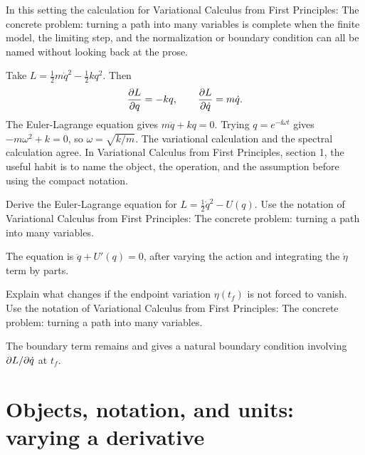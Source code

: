In this setting the calculation for Variational Calculus from First Principles: The concrete problem: turning a path into many variables is complete when the finite model, the limiting step, and the normalization or boundary condition can all be named without looking back at the prose.




\begin{example}
Take \(L=\frac12m\dot q^2-\frac12kq^2\).  Then
\[
  \frac{\partial L}{\partial q}=-kq,\qquad \frac{\partial L}{\partial\dot q}=m\dot q.
\]
The Euler-Lagrange equation gives \(m\ddot q+kq=0\).  Trying \(q=e^{-\ii\omega t}\) gives \(-m\omega^2+k=0\), so \(\omega=\sqrt{k/m}\).  The variational calculation and the spectral calculation agree.  In Variational Calculus from First Principles, section 1, the useful habit is to name the object, the operation, and the assumption before using the compact notation.
\end{example}



\begin{exercise}
Derive the Euler-Lagrange equation for \(L=\frac12\dot q^2-U(q)\).  Use the notation of Variational Calculus from First Principles: The concrete problem: turning a path into many variables.
\begin{answer}
The equation is \(\ddot q+U'(q)=0\), after varying the action and integrating the \(\dot\eta\) term by parts.
\end{answer}
\end{exercise}

\begin{exercise}
Explain what changes if the endpoint variation \(\eta(t_f)\) is not forced to vanish.  Use the notation of Variational Calculus from First Principles: The concrete problem: turning a path into many variables.
\begin{answer}
The boundary term remains and gives a natural boundary condition involving \(\partial L/\partial\dot q\) at \(t_f\).
\end{answer}
\end{exercise}



\section{Objects, notation, and units: varying a derivative}

